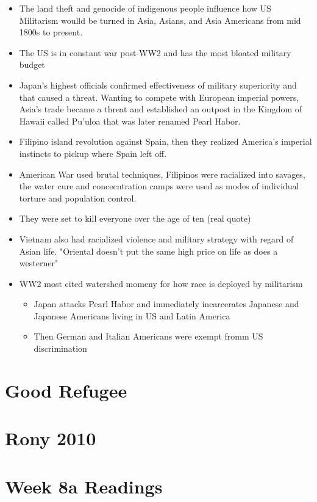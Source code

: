 \documentclass{article}
\begin{document}
  \begin{itemize}
    \item The land theft and genocide of indigenous people 
      influence how US Militarism woulld be turned 
      in Asia, Asians, and Asia Americans from mid 1800s to present.
    \item The US is in constant war post-WW2 and has the most bloated military budget
    \item Japan's highest officials confirmed
      effectiveness of military superiority and that caused a threat.
      Wanting to compete with European imperial powers, Asia's trade became a threat and
      established an outpost in the Kingdom of Hawaii called Pu'uloa that was
      later renamed Pearl Habor.
    \item Filipino island revolution against Spain, then they realized
      America's imperial instincts to pickup where Spain left off.
    \item American War used brutal techniques,
      Filipinos were racialized into savages, the water cure
      and concecntration camps were used as modes of individual torture and population control.
    \item They were set to kill everyone over the age of ten (real quote)
    \item Vietnam also had racialized violence and military strategy with
      regard of Asian life. "Oriental doesn't put the same high price on life as does a westerner"
    \item WW2 most cited watershed momeny for how race is deployed by militarism
      \begin{itemize}
        \item Japan attacks Pearl Habor and immediately incarcerates Japanese and Japanese Americans
          living in US and Latin America
        \item Then German and Italian Americans were exempt fromm US discrimination
      \end{itemize}
  \end{itemize}

  \section{Good Refugee}
  \section{Rony 2010}

  \section*{Week 8a Readings}
\end{document}
